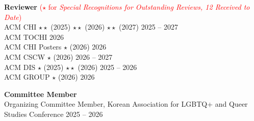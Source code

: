 
\noindent\textbf{Reviewer} \textcolor{red}{($\star$ for \textit{Special Recognitions for Outstanding Reviews, 12 Received to Date})}\\
ACM CHI $\star\star$ (2025) $\star\star$ (2026) $\star\star$ (2027) \hfill{2025 -- 2027}\\
\noindent ACM TOCHI \hfill{2026} \\
\noindent ACM CHI Posters $\star$ (2026) \hfill{2026}\\
\noindent ACM CSCW $\star$ (2026) \hfill{2026 -- 2027}\\
\noindent ACM DIS $\star$ (2025) $\star\star$ (2026) \hfill{2025 -- 2026}\\
\noindent ACM GROUP $\star$ (2026) \hfill{2026}\\

\vspace{-0.2cm}

\noindent \textbf{Committee Member} \\
\noindent Organizing Committee Member, Korean Association for LGBTQ+ and Queer Studies Conference \hfill{2025 -- 2026} \\

